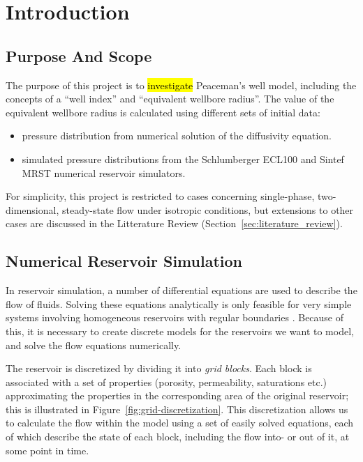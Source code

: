 
\section{Introduction} %
\label{sec:introduction}
\subsection{Purpose And Scope} %
\label{sub:purpose_and_scope}
The purpose of this project is to \hl{investigate} Peaceman's well model, including the concepts of a ``well index'' and ``equivalent wellbore radius''. The value of the equivalent wellbore radius is calculated using different sets of initial data:
\begin{itemize}
    \item pressure distribution from numerical solution of the diffusivity equation.
    \item simulated pressure distributions from the Schlumberger ECL100 and Sintef MRST numerical reservoir simulators.
\end{itemize}

For simplicity, this project is restricted to cases concerning single-phase, two-dimensional, steady-state flow under isotropic conditions, but extensions to other cases are discussed in the Litterature Review (Section~\ref{sec:literature_review}).

\subsection{Numerical Reservoir Simulation} %
\label{sub:numerical_reservoir_simulation}
In reservoir simulation, a number of differential equations are used to describe the flow of fluids. Solving these equations analytically is only feasible for very simple systems involving homogeneous reservoirs with regular boundaries \cite{Peaceman1977Fundamentals}. Because of this, it is necessary to create discrete models for the reservoirs we want to model, and solve the flow equations numerically.


The reservoir is discretized by dividing it into \emph{grid blocks}. Each block is associated with a set of properties (porosity, permeability, saturations etc.) approximating the properties in the corresponding area of the original reservoir; this is illustrated in Figure~\ref{fig:grid-discretization}. This discretization allows us to calculate the flow within the model using a set of easily solved equations, each of which describe the state of each block, including the flow into- or out of it, at some point in time.

